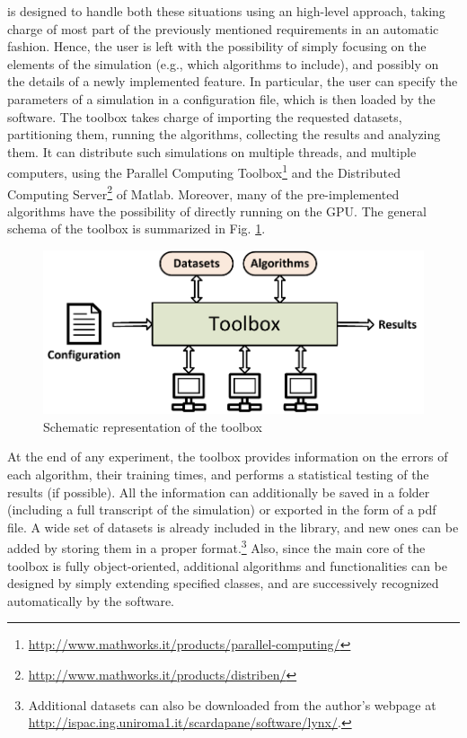 \toolboxname is designed to handle both these situations using an high-level approach, taking charge of most part of the previously mentioned requirements in an automatic fashion. Hence, the user is left with the possibility of simply focusing on the elements of the simulation (e.g., which algorithms to include), and possibly on the details of a newly implemented feature. In particular, the user can specify the parameters of a simulation in a configuration file, which is then loaded by the software. The toolbox takes charge of importing the requested datasets, partitioning them, running the algorithms, collecting the results and analyzing them. It can distribute such simulations on multiple threads, and multiple computers, using the Parallel Computing Toolbox\footnote{\url{http://www.mathworks.it/products/parallel-computing/}} and the Distributed Computing Server\footnote{\url{http://www.mathworks.it/products/distriben/}} of Matlab. Moreover, many of the pre-implemented algorithms have the possibility of directly running on the GPU. The general schema of the toolbox is summarized in Fig. \ref{fig:generalschema}.

\begin{figure}
\centering
\includegraphics[scale=0.7]{./images/ToolboxSchema}
\caption{Schematic representation of the toolbox}
\label{fig:generalschema}
\end{figure}

At the end of any experiment, the toolbox provides information on the errors of each algorithm, their training times, and performs a statistical testing of the results (if possible). All the information can additionally be saved in a folder (including a full transcript of the simulation) or exported in the form of a pdf file. A wide set of datasets is already included in the library, and new ones can be added by storing them in a proper format.\footnote{Additional datasets can also be downloaded from the author’s webpage at \url{http://ispac.ing.uniroma1.it/scardapane/software/lynx/}.} Also, since the main core of the toolbox is fully object-oriented, additional algorithms and functionalities can be designed by simply extending specified classes, and are successively recognized automatically by the software.
 
